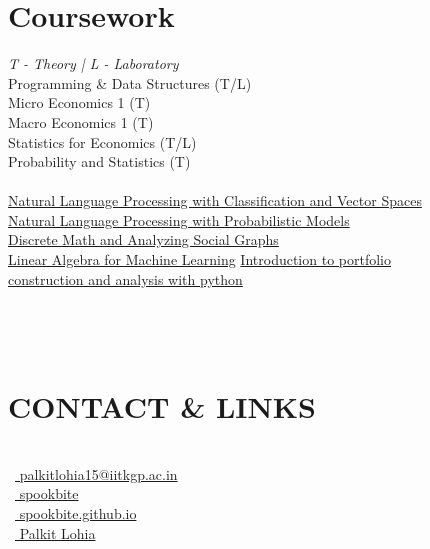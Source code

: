 \documentclass[]{deedy-resume-openfont}
\begin{document}
\begin{minipage}[t]{0.33\textwidth}
\section{Coursework}
\emph{T - Theory | L - Laboratory}\\
Programming \& Data Structures (T/L)\\
Micro Economics 1 (T)\\
Macro Economics 1 (T)\\
Statistics for Economics (T/L)\\
Probability and Statistics (T)\\
\sectionsep
{}\\
\href{https://coursera.org/share/9a2868c911ab931492ad1bfc84b3ac75}{Natural Language Processing with Classification and Vector Spaces}\\
\href{https://coursera.org/share/b77c1d962643f8fa066ca076c3f3be10}{Natural Language Processing with Probabilistic Models}\\
\href{https://coursera.org/share/85611fef8e8312607c95a49a5a63fc87}{Discrete Math and Analyzing Social Graphs}\\
\href{https://coursera.org/share/b76987bf1b6c78e3745c91ced9492502}{Linear Algebra for Machine Learning}
\href{https://coursera.org/share/7446c90cce3eeb7deb317fd868c0fa4f}{Introduction to portfolio\\ construction and analysis with python}\\


\\~\\~\\

\section{CONTACT \& LINKS} 
\\
\faEnvelope\ {\href{mailto:palkitlohia15@iitkgp.ac.in}{ palkitlohia15@iitkgp.ac.in}}\\
\faGithub\ {\href{https://github.com/spookbite}{ spookbite}}\\
\faGlobe\ {\href{https://spookbite.github.io/}{ spookbite.github.io}}\\
\faLinkedinSquare\ {\href{https://www.linkedin.com/in/palkit-l-49aa66195/}{ Palkit Lohia}}\\
\\
\sectionsep
 \\~\\
 
%
%

\end{minipage} 
\end{document}
